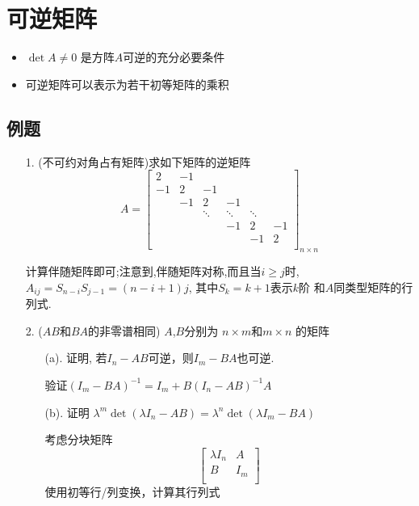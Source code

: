 \section{可逆矩阵}
\begin{itemize}
\item $\det A \ne 0$ 是方阵$A$可逆的充分必要条件
\item 可逆矩阵可以表示为若干初等矩阵的乘积
\end{itemize}

\subsection*{例题}
\begin{itemize}
	\item[1.] (不可约对角占有矩阵)求如下矩阵的逆矩阵
	\begin{equation} \nonumber
	A = \begin{bmatrix}
		2& -1& & & & \\
		-1& 2&-1&& & \\
		& -1& 2& -1& &\\
		&& \ddots& \ddots& \ddots\\
		&&& -1& 2& -1\\
		&&&& -1& 2\\
	\end{bmatrix}_{n \times n}
	\end{equation}
	\begin{solution}
		计算伴随矩阵即可;注意到,伴随矩阵对称,而且当$i\ge j$时,
		$A_{ij}= S_{n-i}S_{j-1} = (n-i+1)j$, 其中$S_{k} = k+1$表示$k$阶
		和$A$同类型矩阵的行列式.
	\end{solution}
	\vspace{2cm}

	\item[2.] ($AB$和$BA$的非零谱相同) $A$,$B$分别为 $n\times m$和$m\times n$
	的矩阵
	\begin{itemize}
		\item [(a).] 证明, 若$I_n - AB$可逆，则$I_m - BA$也可逆.
		\begin{solution}
			验证$(I_m - BA)^{-1} = I_m + B(I_n-AB)^{-1}A$
		\end{solution}
		\vspace{2cm}

		\item [(b).] 证明  $\lambda^{m}\det(\lambda I_n - AB) = 
		                   \lambda^{n}\det(\lambda I_m - BA)$
		\begin{solution}
			考虑分块矩阵
			\begin{equation} \nonumber
			\begin{bmatrix}
				\lambda I_n & A\\
				B& I_m\\
			\end{bmatrix}
			\end{equation}
			使用初等行/列变换，计算其行列式
		\end{solution}
		\vspace{2cm}
	\end{itemize}
\end{itemize}

